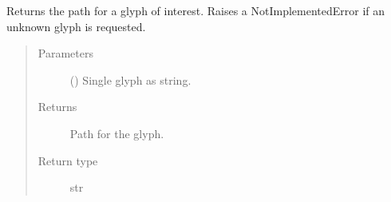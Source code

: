 \documentclass[a4paper,10pt,english,openany,oneside]{sphinxmanual}
\begin{document}

\begin{fulllineitems}
\label{\detokenize{pages/modules:lmd.tools.glyph_path}}
\sphinxAtStartPar
Returns the path for a glyph of interest. Raises a NotImplementedError if an unknown glyph is requested.
\begin{quote}\begin{description}
\item[{Parameters}] \leavevmode
\sphinxAtStartPar
{} () \textendash{} Single glyph as string.

\item[{Returns}] \leavevmode
\sphinxAtStartPar
Path for the glyph.

\item[{Return type}] \leavevmode
\sphinxAtStartPar
str

\end{description}\end{quote}

\end{fulllineitems}

\end{document}

